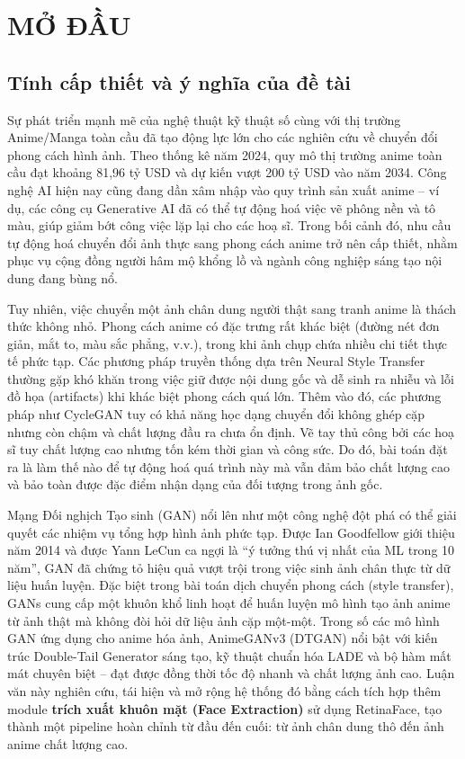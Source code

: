 \clearpage
{}

\chapter*{MỞ ĐẦU}

\section*{Tính cấp thiết và ý nghĩa của đề tài}

Sự phát triển mạnh mẽ của nghệ thuật kỹ thuật số cùng với thị trường Anime/Manga toàn cầu đã tạo động lực lớn cho các nghiên cứu về chuyển đổi phong cách hình ảnh. Theo thống kê năm 2024, quy mô thị trường anime toàn cầu đạt khoảng 81,96 tỷ USD và dự kiến vượt 200 tỷ USD vào năm 2034. Công nghệ AI hiện nay cũng đang dần xâm nhập vào quy trình sản xuất anime -- ví dụ, các công cụ Generative AI đã có thể tự động hoá việc vẽ phông nền và tô màu, giúp giảm bớt công việc lặp lại cho các hoạ sĩ. Trong bối cảnh đó, nhu cầu tự động hoá chuyển đổi ảnh thực sang phong cách anime trở nên cấp thiết, nhằm phục vụ cộng đồng người hâm mộ khổng lồ và ngành công nghiệp sáng tạo nội dung đang bùng nổ.

Tuy nhiên, việc chuyển một ảnh chân dung người thật sang tranh anime là thách thức không nhỏ. Phong cách anime có đặc trưng rất khác biệt (đường nét đơn giản, mắt to, màu sắc phẳng, v.v.), trong khi ảnh chụp chứa nhiều chi tiết thực tế phức tạp. Các phương pháp truyền thống dựa trên Neural Style Transfer thường gặp khó khăn trong việc giữ được nội dung gốc và dễ sinh ra nhiễu và lỗi đồ họa (artifacts) khi khác biệt phong cách quá lớn. Thêm vào đó, các phương pháp như CycleGAN tuy có khả năng học dạng chuyển đổi không ghép cặp nhưng còn chậm và chất lượng đầu ra chưa ổn định. Vẽ tay thủ công bởi các hoạ sĩ tuy chất lượng cao nhưng tốn kém thời gian và công sức. Do đó, bài toán đặt ra là làm thế nào để tự động hoá quá trình này mà vẫn đảm bảo chất lượng cao và bảo toàn được đặc điểm nhận dạng của đối tượng trong ảnh gốc.

Mạng Đối nghịch Tạo sinh (GAN) nổi lên như một công nghệ đột phá có thể giải quyết các nhiệm vụ tổng hợp hình ảnh phức tạp. Được Ian Goodfellow giới thiệu năm 2014 \cite{Goodfellow2014} và được Yann LeCun ca ngợi là ``ý tưởng thú vị nhất của ML trong 10 năm'', GAN đã chứng tỏ hiệu quả vượt trội trong việc sinh ảnh chân thực từ dữ liệu huấn luyện. Đặc biệt trong bài toán dịch chuyển phong cách (style transfer), GANs cung cấp một khuôn khổ linh hoạt để huấn luyện mô hình tạo ảnh anime từ ảnh thật mà không đòi hỏi dữ liệu ảnh cặp một-một. Trong số các mô hình GAN ứng dụng cho anime hóa ảnh, AnimeGANv3 (DTGAN) \cite{Liu2024} nổi bật với kiến trúc Double-Tail Generator sáng tạo, kỹ thuật chuẩn hóa LADE và bộ hàm mất mát chuyên biệt -- đạt được đồng thời tốc độ nhanh và chất lượng ảnh cao. Luận văn này nghiên cứu, tái hiện và mở rộng hệ thống đó bằng cách tích hợp thêm module \textbf{trích xuất khuôn mặt (Face Extraction)} sử dụng RetinaFace, tạo thành một pipeline hoàn chỉnh từ đầu đến cuối: từ ảnh chân dung thô đến ảnh anime chất lượng cao.

